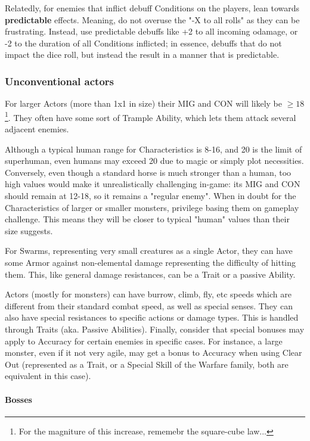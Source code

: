 Relatedly, for enemies that inflict debuff Conditions on the players, lean towards \textbf{predictable} effects. Meaning, do not overuse the "-X to all rolls" as they can be frustrating. Instead, use predictable debuffs like +2 to all incoming odamage, or -2 to the duration of all Conditions inflicted; in essence, debuffs that do not impact the dice roll, but instead the result in a manner that is predictable.


\subsubsection{Unconventional actors}

For larger Actors (more than 1x1 in size) their MIG and CON will likely be $\geq18$\footnote{For the magniture of this increase, rememebr the square-cube law...}. They often have some sort of Trample Ability, which lets them attack several adjacent enemies.

Although a typical human range for Characteristics is 8-16, and 20 is the limit of superhuman, even humans may exceed 20 due to magic or simply plot necessities. Conversely, even though a standard horse is much stronger than a human, too high values would make it unrealistically challenging in-game: its MIG and CON should remain at 12-18, so it remains a "regular enemy". When in doubt for the Characteristics of larger or smaller monsters, privilege basing them on gameplay challenge. This means they will be closer to typical "human" values than their size suggests.

For Swarms, representing very small creatures as a single Actor, they can have some Armor against non-elemental damage representing the difficulty of hitting them. This, like general damage resistances, can be a Trait or a passive Ability.

Actors (mostly for monsters) can have burrow, climb, fly, etc speeds which are different from their standard combat speed, as well as special senses. They can also have special resistances to specific actions or damage types. This is handled through Traits (aka. Passive Abilities). Finally, consider that special bonuses may apply to Accuracy for certain enemies in specific cases. For instance, a large monster, even if it not very agile, may get a bonus to Accuracy when using Clear Out (represented as a Trait, or a Special Skill of the Warfare family, both are equivalent in this case).


\paragraph{Bosses}

